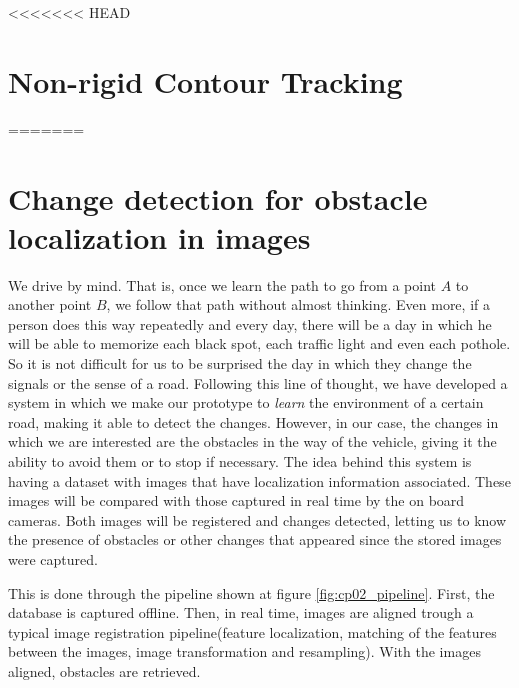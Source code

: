 
\graphicspath{{./images/chapter02/bmps/}{./images/chapter02/vects/}{./images/chapter02/}}

<<<<<<< HEAD
\chapter{Non-rigid Contour Tracking}\label{ch:chapter02}
=======
\chapter{Change detection for obstacle localization in images}\label{ch:chapter02}

We drive by mind. That is, once we learn the path to go from a point $A$ to another point $B$, we follow that path without almost thinking. Even more, if a person does this way repeatedly and every day, there will be a day in which he will be able to memorize each black spot, each traffic light and even each pothole. So it is not difficult for us to be surprised the day in which they change the signals or the sense of a road.
Following this line of thought, we have developed a system in which we make our prototype to \emph{learn} the environment of a certain road, making it able to detect the changes. However, in our case, the changes in which we are interested are the obstacles in the way of the vehicle, giving it the ability to avoid them or to stop if necessary. The idea behind this system is having a dataset with images that have localization information associated. These images will be compared with those captured in real time by the on board cameras. Both images will be registered and changes detected, letting us to know the presence of obstacles or other changes that appeared since the stored images were captured.

This is done through the pipeline shown at figure \ref{fig:cp02_pipeline}. First, the database is captured offline. Then, in real time, images are aligned trough a typical image registration pipeline(feature localization, matching of the features between the images, image transformation and resampling). With the images aligned,  obstacles are retrieved.

